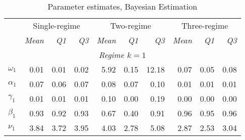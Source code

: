 \documentclass[12pt,a4paper]{article}
\begin{document}
\begin{table}[htbp]
\center
\begin{threeparttable}
\caption{Parameter estimates, Bayesian Estimation}
\label{table:params_mcmc}
\begin{tabular}{llllrrrrrr}
\hline
               & \multicolumn{3}{c}{Single-regime}                                                                     & \multicolumn{3}{c}{Two-regime}                                        & \multicolumn{3}{c}{Three-regime}                              \\
               & \multicolumn{1}{r}{\textit{Mean}} & \multicolumn{1}{r}{\textit{Q1}} & \multicolumn{1}{r}{\textit{Q3}} & \textit{Mean}         & \textit{Q1}           & \textit{Q3}           & \textit{Mean} & \textit{Q1}           & \textit{Q3}           \\ \hline
\multicolumn{10}{c}{\textit{Regime $k=1$}}                                                                                                                                                                                                                     \\
$\omega_1$     & \multicolumn{1}{r}{0.01}          & \multicolumn{1}{r}{0.01}        & \multicolumn{1}{r}{0.02}        & 5.92                  & 0.15                  & 12.18                 & 0.07          & 0.05                  & 0.08                  \\
$\alpha_1$     & \multicolumn{1}{r}{0.07}          & \multicolumn{1}{r}{0.06}        & \multicolumn{1}{r}{0.07}        & 0.08                  & 0.07                  & 0.10                  & 0.01          & 0.01                  & 0.01                  \\
$\gamma_1$     & \multicolumn{1}{r}{0.01}          & \multicolumn{1}{r}{0.01}        & \multicolumn{1}{r}{0.01}        & 0.10                  & 0.00                  & 0.19                  & 0.00          & 0.00                  & 0.00                  \\
$\beta_1$      & \multicolumn{1}{r}{0.93}          & \multicolumn{1}{r}{0.92}        & \multicolumn{1}{r}{0.93}        & 0.67                  & 0.40                  & 0.91                  & 0.96          & 0.95                  & 0.96                  \\
$\nu_1$        & \multicolumn{1}{r}{3.84}          & \multicolumn{1}{r}{3.72}        & \multicolumn{1}{r}{3.95}        & 4.03                  & 2.78                  & 5.08                  & 2.87          & 2.53                  & 3.04                  \\

\end{tabular}
\end{threeparttable}
\end{table}
\end{document}
